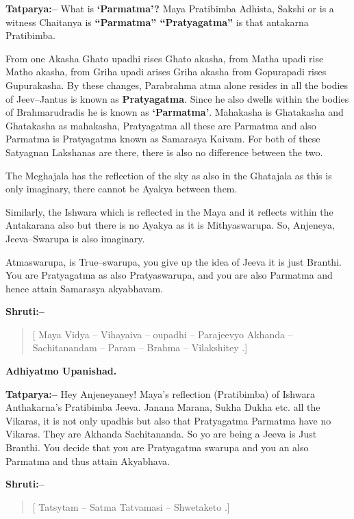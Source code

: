 \textbf{Tatparya:–} What is \textbf{‘Parmatma’?} Maya Pratibimba Adhista, Sakshi or is a witness Chaitanya is \textbf{“Parmatma” “Pratyagatma”} is that antakarna Pratibimba.

From one Akasha Ghato upadhi rises Ghato akasha, from Matha upadi rise Matho akasha, from Griha upadi arises Griha akasha from Gopurapadi rises Gupurakasha. By these changes, Parabrahma atma alone resides in all the bodies of Jeev–Jantus is known as \textbf{Pratyagatma}. Since he also dwells within the bodies of Brahmarudradis he is known as \textbf{‘Parmatma’}. Mahakasha is Ghatakasha and Ghatakasha as mahakasha, Pratyagatma all these are Parmatma and also Parmatma is Pratyagatma known as Samarasya Kaivam. For both of these Satyagnan Lakshanas are there, there is also no difference between the two.

The Meghajala has the reflection of the sky as also in the Ghatajala as this is only imaginary, there cannot be Ayakya between them.

Similarly, the Ishwara which is reflected in the Maya and it reflects within the Antakarana also but there is no Ayakya as it is Mithyaswarupa. So, Anjeneya, Jeeva–Swarupa is also imaginary.

Atmaswarupa, is True–swarupa, you give up the idea of Jeeva it is just Branthi. You are Pratyagatma as also Pratyaswarupa, and you are also Parmatma and hence attain Samarasya akyabhavam.

\textbf{Shruti:–}

\begin{verse}
[ Maya Vidya – Vihayaiva – oupadhi – Parajeevyo  Akhanda – Sachitanandam – Param – Brahma – Vilakshitey .]
\end{verse}

\begin{flushright}
\textbf{Adhiyatmo Upanishad.}
\end{flushright}

\textbf{Tatparya:–} Hey Anjeneyaney! Maya's reflection (Pratibimba) of Ishwara Anthakarna's Pratibimba Jeeva. Janana Marana, Sukha Dukha etc. all the Vikaras, it is not only upadhis but also that Pratyagatma Parmatma have no Vikaras. They are Akhanda Sachitananda. So yo are being a Jeeva is Just Branthi. You decide that you are Pratyagatma swarupa and you an also Parmatma and thus attain Akyabhava.

\textbf{Shruti:–}

\begin{verse}
[ Tatsytam – Satma Tatvamasi – Shwetaketo .]
\end{verse}

